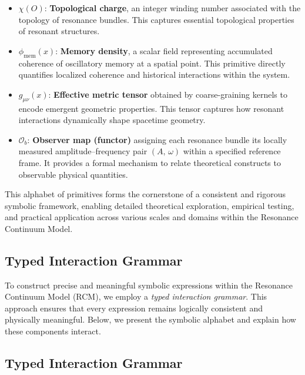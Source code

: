 \begin{itemize}
    \item $\chi(O)$: \textbf{Topological charge}, an integer winding number associated with the topology of resonance bundles. This captures essential topological properties of resonant structures.

    \item $\phi_{\mathrm{mem}}(x)$: \textbf{Memory density}, a scalar field representing accumulated coherence of oscillatory memory at a spatial point. This primitive directly quantifies localized coherence and historical interactions within the system.

    \item $g_{\mu\nu}(x)$: \textbf{Effective metric tensor} obtained by coarse-graining kernels to encode emergent geometric properties. This tensor captures how resonant interactions dynamically shape spacetime geometry.

    \item $\mathcal{O}_b$: \textbf{Observer map (functor)} assigning each resonance bundle its locally measured amplitude–frequency pair $(A,\,\omega)$ within a specified reference frame. It provides a formal mechanism to relate theoretical constructs to observable physical quantities.
\end{itemize}

This alphabet of primitives forms the cornerstone of a consistent and rigorous symbolic framework, enabling detailed theoretical exploration, empirical testing, and practical application across various scales and domains within the Resonance Continuum Model.

\bigskip
\subsection{Typed Interaction Grammar}

To construct precise and meaningful symbolic expressions within the Resonance Continuum Model (RCM), we employ a \emph{typed interaction grammar}.  This approach ensures that every expression remains logically consistent and physically meaningful.  Below, we present the symbolic alphabet and explain how these components interact.

\providecommand{\NT}[1]{\texttt{#1}}
\providecommand{\bnfis}{\;::=\;}
\providecommand{\alt}{\;\mid\;}

\subsection{Typed Interaction Grammar}

